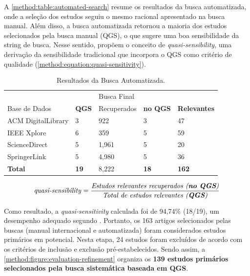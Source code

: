 A \autoref{method:table:automated-search} resume os resultados da busca automatizada, onde a seleção dos estudos seguiu o mesmo racional apresentado na busca manual. Além disso, a busca automatizada retornou a maioria dos estudos selecionados pela busca manual (QGS), o que sugere uma boa sensibilidade da string de busca. Nesse sentido,  propõem o conceito de \textit{quasi-sensibility}, uma derivação da sensibilidade tradicional que incorpora o QGS como critério de qualidade (\autoref{method:equation:quasi-sensitivity}).

\begin{table}[htb]
\centering
\caption{Resultados da Busca Automatizada.}
\label{method:table:automated-search}
\begin{tabular}{ll|lll} \hline
 &  & Busca Final &                 &                   \\ \cline{3-5} 
Base de Dados & \textbf{QGS} & Recuperados    & \textbf{no QGS} & \textbf{Relevantes} \\ \hline
ACM DigitalLibrary & 3            & 922          & 3               & 47                \\
IEEE Xplore        & 6            & 359          & 5               & 59                \\
ScienceDirect      & 5            & 1,961        & 5               & 20                \\
SpringerLink       & 5            & 4,980        & 5               & 36                \\ \hline
\multicolumn{1}{l}{\textbf{Total}}   & \textbf{19}  & 8,222        & \textbf{18}     & \textbf{162}      \\ \hline
\end{tabular}
\end{table}

\begin{equation}
\label{method:equation:quasi-sensitivity}
\text{\textit{quasi-sensibility}} = \frac{\text{\textit{Estudos relevantes recuperados (\textbf{no QGS})}}}{\text{\textit{Total de estudos relevantes (\textbf{QGS})}}}
\end{equation}

Como resultado, a \textit{quasi-sensitivity} calculada foi de 94,74\% (18/19), um desempenho adequado segundo . Portanto, os 163 artigos selecionados pelas buscas (manual internacional e automatizada) foram considerados estudos primários em potencial. Nesta etapa, 24 estudos foram excluídos de acordo com os critérios de inclusão e exclusão pré-estabelecidos. Sendo assim, a \autoref{method:figure:evaluation-refinement} organiza os \textbf{139 estudos primários selecionados pela busca sistemática baseada em QGS}.

